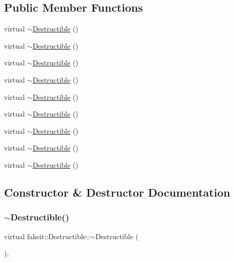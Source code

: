 \subsection*{Public Member Functions}
\begin{DoxyCompactItemize}
\item 
virtual \mbox{\hyperlink{classfakeit_1_1Destructible_a8b6d11459f396d2c20d536b09e5eb604}{$\sim$\+Destructible}} ()
\item 
virtual \mbox{\hyperlink{classfakeit_1_1Destructible_a8b6d11459f396d2c20d536b09e5eb604}{$\sim$\+Destructible}} ()
\item 
virtual \mbox{\hyperlink{classfakeit_1_1Destructible_a8b6d11459f396d2c20d536b09e5eb604}{$\sim$\+Destructible}} ()
\item 
virtual \mbox{\hyperlink{classfakeit_1_1Destructible_a8b6d11459f396d2c20d536b09e5eb604}{$\sim$\+Destructible}} ()
\item 
virtual \mbox{\hyperlink{classfakeit_1_1Destructible_a8b6d11459f396d2c20d536b09e5eb604}{$\sim$\+Destructible}} ()
\item 
virtual \mbox{\hyperlink{classfakeit_1_1Destructible_a8b6d11459f396d2c20d536b09e5eb604}{$\sim$\+Destructible}} ()
\item 
virtual \mbox{\hyperlink{classfakeit_1_1Destructible_a8b6d11459f396d2c20d536b09e5eb604}{$\sim$\+Destructible}} ()
\item 
virtual \mbox{\hyperlink{classfakeit_1_1Destructible_a8b6d11459f396d2c20d536b09e5eb604}{$\sim$\+Destructible}} ()
\item 
virtual \mbox{\hyperlink{classfakeit_1_1Destructible_a8b6d11459f396d2c20d536b09e5eb604}{$\sim$\+Destructible}} ()
\end{DoxyCompactItemize}


\subsection{Constructor \& Destructor Documentation}
\mbox{\label{classfakeit_1_1Destructible_a8b6d11459f396d2c20d536b09e5eb604}} 
\subsubsection{\texorpdfstring{$\sim$Destructible()}{~Destructible()}\hspace{0.1cm}{\footnotesize\ttfamily [1/9]}}
{\footnotesize\ttfamily virtual fakeit\+::\+Destructible\+::$\sim$\+Destructible (\begin{DoxyParamCaption}{ }\end{DoxyParamCaption})\hspace{0.3cm}{\ttfamily [inline]}, {\ttfamily [virtual]}}

